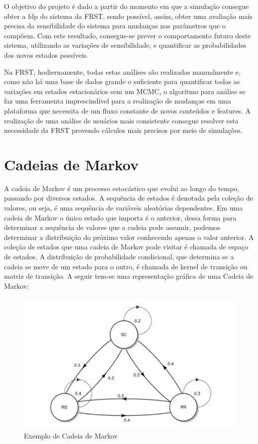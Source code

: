 O objetivo do projeto é dado a partir do momento em que a simulação consegue obter a fdp do sistema da FRST, sendo possível, assim, obter uma avaliação mais precisa da sensibilidade do sistema para mudanças nos parâmetros que o compõem. Com este resultado, consegue-se prever o comportamento futuro deste sistema, utilizando as variações de sensibilidade, e quantificar as probabilidades dos novos estados possíveis.

Na FRST, hodiernamente, todas estas análises são realizadas manualmente e, como não há uma base de dados grande o suficiente para quantificar todas as variações em estados estacionários sem um MCMC, o algoritmo para análise se faz uma ferramenta imprescindível para a realização de mudanças em uma plataforma que necessita de um fluxo constante de novos conteúdos e features. A realização de uma análise de usuários mais consistente consegue resolver esta necessidade da FRST provendo cálculos mais precisos por meio de simulações.


\section{Cadeias de Markov}

A cadeia de Markov é um processo estocástico que evolui ao longo do tempo, passando por diversos estados. A sequência de estados é denotada pela coleção de valores, ou seja, é uma sequência de variáveis aleatórias dependentes. Em uma cadeia de Markov o único estado que importa é o anterior, dessa forma para determinar a sequência de valores que a cadeia pode assumir, podemos determinar a distribuição do próximo valor conhecendo apenas o valor anterior. A coleção de estados que uma cadeia de Markov pode visitar é chamada de espaço de estados. A distribuição de probabilidade condicional, que determina se a cadeia se move de um estado para o outro, é chamada de kernel de transição ou matriz de transição. A seguir tem-se uma representação gráfica de uma Cadeia de Markov: 

\begin{figure}
    \centering
    \includegraphics[width = .9\linewidth]{relatorios/frst/figuras/markov.png}
        \caption{Exemplo de Cadeia de Markov}

    \label{fig:mapa}
\end{figure}

